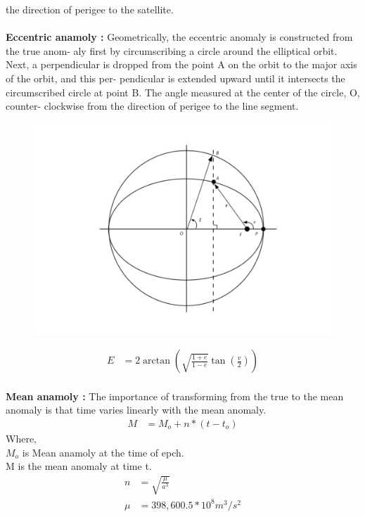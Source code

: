 \documentclass[10pt]{book}
\begin{document}
the direction of perigee to the satellite.\\ 
\\
\textbf{Eccentric anamoly :} Geometrically, the eccentric anomaly is constructed from the true anom-
aly first by circumscribing a circle around the elliptical orbit. Next, a perpendicular
is dropped from the point A on the orbit to the major axis of the orbit, and this per-
pendicular is extended upward until it intersects the circumscribed circle at point B. The angle measured at the center of the circle, O, counter-
clockwise from the direction of perigee to the line segment.
\begin{figure}
  \includegraphics[scale=0.4]{./figs/2.pdf}
  \end{figure}
 \begin{align}
E&=2\arctan (\sqrt{\frac{1+e}{1-e}}\tan(\frac{v}{2})  )
 \end{align}
 \\
 \textbf{Mean anamoly :} The importance of transforming from the true to the mean
 anomaly is that time varies linearly with the mean anomaly.\\
 \begin{align}
  M&=M_o+n*(t-t_o)
 \end{align}
 Where,\\
 $M_o$ is Mean anamoly at the time of epch.\\
 M is the mean anomaly at time t.\\
 \begin{align}
  n&=\sqrt{\frac{\mu }{a^3}} \\
  \mu&=398,600.5 * 10^8 m^3/s^2
 \end{align} 
 \\
\end{document}
